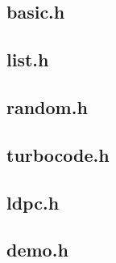 \documentclass{article}
\begin{document}
\subsection{basic.h}

\newpage

\subsection{list.h}

\newpage

\subsection{random.h}

\newpage

\subsection{turbocode.h}

\newpage

\subsection{ldpc.h}

\newpage

\subsection{demo.h}

\newpage
\end{document}
